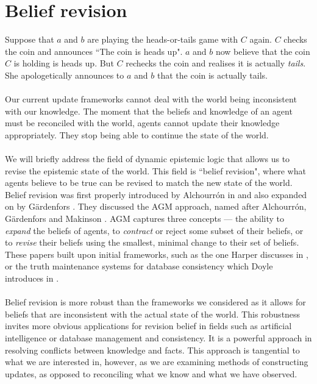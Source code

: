 \section{Belief revision}

Suppose that $a$ and $b$ are playing the heads-or-tails game with $C$ again.
$C$ checks the coin and announces ``The coin is heads up".
$a$ and $b$ now believe that the coin $C$ is holding is heads up.
But $C$ rechecks the coin and realises it is actually {\em tails}.
She apologetically announces to $a$ and $b$ that the coin is actually tails.\\
\\
Our current update frameworks cannot deal with the world being inconsistent with
our knowledge.
The moment that the beliefs and knowledge of an agent must be reconciled with
the world, agents cannot update their knowledge appropriately.
They stop being able to continue the state of the world.\\
\\
We will briefly address the field of dynamic epistemic logic that allows us to revise the epistemic state of the
world.
This field is ``belief revision", where what agents believe to be true can be
revised to match the new state of the world.
Belief revision was first properly introduced by Alchourr{\'o}n in \cite{theLogicOfTheoryChange} and also
expanded on by G{\"a}rdenfors \cite{gairdenfors1988knowledge}.
They discussed the AGM approach, named after Alchourr{\'o}n, G{\"a}rdenfors and Makinson
\cite{theLogicOfTheoryChange}.
AGM captures three concepts --- the ability to {\em expand} the beliefs of agents, to {\em contract}
or reject some subset of their beliefs, or to {\em revise} their beliefs using the smallest, minimal
change to their set of beliefs.
These papers built upon initial frameworks, such as the one Harper discusses in
\cite{harper1976rational}, or the truth maintenance systems for database
consistency which Doyle introduces in \cite{Doyle1979231}.\\
\\
Belief revision is more robust than the frameworks we considered as it allows
for beliefs that are inconsistent with the actual state of the world.
This robustness invites more obvious applications for revision belief in fields such as
artificial intelligence or database management and consistency.
It is a powerful approach in resolving conflicts between knowledge and facts.
This approach is tangential to what we are interested in, however, as we are
examining methods of constructing updates, as opposed to reconciling what we
know and what we have observed.

